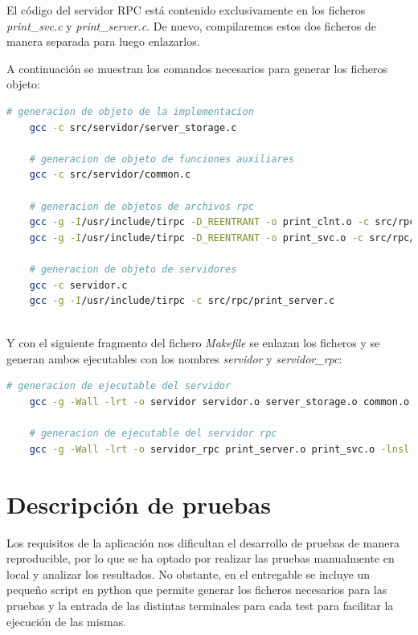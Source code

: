 \documentclass[]{article}
\begin{document}
El código del servidor RPC está contenido exclusivamente en los ficheros \textit{print\_svc.c} y \textit{print\_server.c}. De nuevo, compilaremos estos dos ficheros de manera separada para luego enlazarlos.

A continuación se muestran los comandos necesarios para generar los ficheros objeto:

\begin{center}
  \begin{lstlisting}[caption=Compilación de ficheros en ficheros objetos, language=bash]
    # generacion de objeto de la implementacion
    gcc -c src/servidor/server_storage.c
    
    # generacion de objeto de funciones auxiliares
    gcc -c src/servidor/common.c

    # generacion de objetos de archivos rpc
    gcc -g -I/usr/include/tirpc -D_REENTRANT -o print_clnt.o -c src/rpc/print_clnt.c
    gcc -g -I/usr/include/tirpc -D_REENTRANT -o print_svc.o -c src/rpc/print_svc.c

    # generacion de objeto de servidores
    gcc -c servidor.c
    gcc -g -I/usr/include/tirpc -c src/rpc/print_server.c
    
    \end{lstlisting}
\end{center}

Y con el siguiente fragmento del fichero \textit{Makefile} se enlazan los ficheros y se generan ambos ejecutables con los nombres \textit{servidor} y \textit{servidor\_rpc}:

\begin{center}
  \begin{lstlisting}[caption=Generación de ejecutables, language=bash]
    # generacion de ejecutable del servidor
    gcc -g -Wall -lrt -o servidor servidor.o server_storage.o common.o print_clnt.o -lnsl -lpthread -ldl -ltirpc
    
    # generacion de ejecutable del servidor rpc
    gcc -g -Wall -lrt -o servidor_rpc print_server.o print_svc.o -lnsl -lpthread -ldl -ltirpc

    \end{lstlisting}
\end{center}

\section{Descripción de pruebas}
\label{sec:descripcion_de_pruebas}
Los requisitos de la aplicación nos dificultan el desarrollo de pruebas de manera reproducible, por lo que se ha optado por realizar las pruebas manualmente en local y analizar los resultados. No obstante, en el entregable se incluye un pequeño script en python que permite generar los ficheros necesarios para las pruebas y la entrada de las distintas terminales para cada test para facilitar la ejecución de las mismas.
\end{document}
